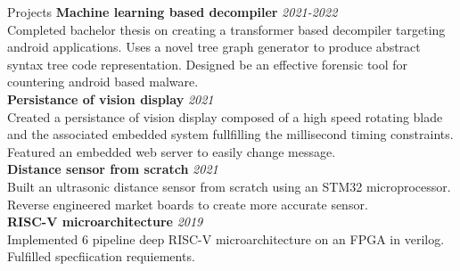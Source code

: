 \documentclass{resume}
\begin{document}
\begin{small}
	\begin{rSection}{Projects}
		{\bf Machine learning based decompiler} \hfill {\em 2021-2022} \\
		Completed bachelor thesis on creating a transformer based decompiler targeting android applications. Uses a novel tree graph generator to produce abstract syntax tree code representation. Designed be an effective forensic tool for countering android based malware. \\
		{\bf Persistance of vision display} \hfill {\em 2021} \\
		Created a persistance of vision display composed of a high speed rotating blade and the associated embedded system fullfilling the millisecond timing constraints. Featured an embedded web server to easily change message. \\
		{\bf Distance sensor from scratch} \hfill {\em 2021} \\
		Built an ultrasonic distance sensor from scratch using an STM32 microprocessor. Reverse engineered market boards to create more accurate sensor. \\
		{\bf RISC-V microarchitecture} \hfill {\em 2019} \\
		Implemented 6 pipeline deep RISC-V microarchitecture on an FPGA in verilog. Fulfilled specfiication requiements. \\
	\end{rSection}


\end{small}
\end{document}

